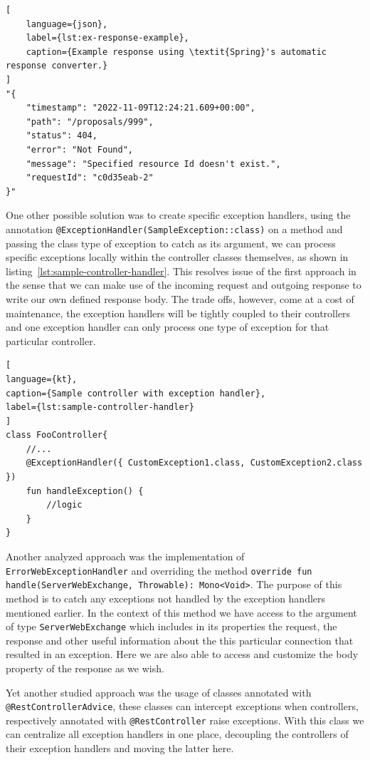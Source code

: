 \begin{lstlisting}[
    language={json},
    label={lst:ex-response-example},
    caption={Example response using \textit{Spring}'s automatic response converter.}
]
"{
    "timestamp": "2022-11-09T12:24:21.609+00:00",
    "path": "/proposals/999",
    "status": 404,
    "error": "Not Found",
    "message": "Specified resource Id doesn't exist.",
    "requestId": "c0d35eab-2"
}"
\end{lstlisting}


One other possible solution was to create specific exception handlers, using the annotation \lstinline{@ExceptionHandler(SampleException::class)} on a method and passing the class type of exception to catch as its argument, we can process specific exceptions locally within the controller classes themselves, as shown in listing~\ref{lst:sample-controller-handler}. This resolves issue of the first approach in the sense that we can make use of the incoming request and outgoing response to write our own defined response body. 
The trade offs, however, come at a cost of maintenance, the exception handlers will be tightly coupled to their controllers and one exception handler can only process one type of exception for that particular controller.

\begin{lstlisting}[
language={kt},
caption={Sample controller with exception handler},
label={lst:sample-controller-handler}
]
class FooController{
    //...
    @ExceptionHandler({ CustomException1.class, CustomException2.class })
    fun handleException() {
        //logic
    }
}    
\end{lstlisting}

Another analyzed approach was the implementation of \lstinline{ErrorWebExceptionHandler} and overriding the method \lstinline{override fun handle(ServerWebExchange, Throwable): Mono<Void>}. The purpose of this method is to catch any exceptions not handled by the exception handlers mentioned earlier. In the context of this method we have access to the argument of type \lstinline{ServerWebExchange} which includes in its properties the request, the response and other useful information about the this particular connection that resulted in an exception. Here we are also able to access and customize the body property of the response as we wish.

Yet another studied approach was the usage of classes annotated with \\\lstinline{@RestControllerAdvice}, these classes can intercept exceptions when controllers, respectively annotated with \lstinline{@RestController} raise exceptions. With this class we can centralize all exception handlers in one place, decoupling the controllers of their exception handlers and moving the latter here. 


